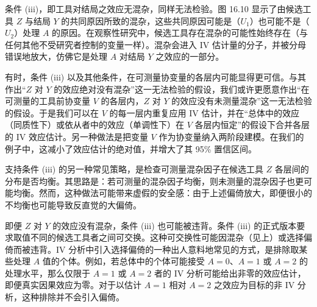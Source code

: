 \begin{figure}[!ht]
\centering
{}
\caption{}
\label{fig:16.9}
\end{figure}

条件 (iii)，即工具对结局之效应无混杂，同样无法检验。图 16.10 显示了由候选工具 $Z$ 与结局 $Y$ 的共同原因所致的混杂，这些共同原因可能是（$U_1$）也可能不是（$U_2$）处理 $A$ 的原因。在观察性研究中，候选工具存在混杂的可能性始终存在（与任何其他不受研究者控制的变量一样）。混杂会进入 IV 估计量的分子，并被分母错误地放大，仿佛它是处理 $A$ 对结局 $Y$ 之效应的一部分。

\begin{figure}[!ht]
\centering
{}
\caption{}
\label{fig:16.10}
\end{figure}

有时，条件 (iii) 以及其他条件，在可测量协变量的各层内可能显得更可信。与其作出“$Z$ 对 $Y$ 的效应绝对没有混杂”这一无法检验的假设，我们或许更愿意作出“在可测量的工具前协变量 $V$ 的各层内，$Z$ 对 $Y$ 的效应没有未测量混杂”这一无法检验的假设。于是我们可以在 $V$ 的每一层内重复应用 IV 估计，并在“总体中的效应（同质性下）或依从者中的效应（单调性下）在 $V$ 各层内恒定”的假设下合并各层的 IV 效应估计。另一种做法是把变量 $V$ 作为协变量纳入两阶段建模。在我们的例子中，这减小了效应估计的绝对值，并增大了其 95\% 置信区间。

支持条件 (iii) 的另一种常见策略，是检查可测量混杂因子在候选工具 $Z$ 各层间的分布是否均衡。其思路是：若可测量的混杂因子均衡，则未测量的混杂因子也更可能均衡。然而，这种做法可能带来虚假的安全感：由于上述偏倚放大，即便很小的不均衡也可能导致反直觉的大偏倚。

即便 $Z$ 对 $Y$ 的效应没有混杂，条件 (iii) 也可能被违背。条件 (iii) 的正式版本要求取值不同的候选工具者之间可交换。这种可交换性可能因混杂（见上）或选择偏倚而被违背。IV 分析中引入选择偏倚的一种出人意料地常见的方式，是排除取某些处理 $A$ 值的个体。例如，若总体中的个体可能接受 $A=0$、$A=1$ 或 $A=2$ 的处理水平，那么仅限于 $A=1$ 或 $A=2$ 者的 IV 分析可能给出非零的效应估计，即便真实因果效应为零。对于以估计 $A=1$ 相对 $A=2$ 之效应为目标的非 IV 分析，这种排除并不会引入偏倚。

